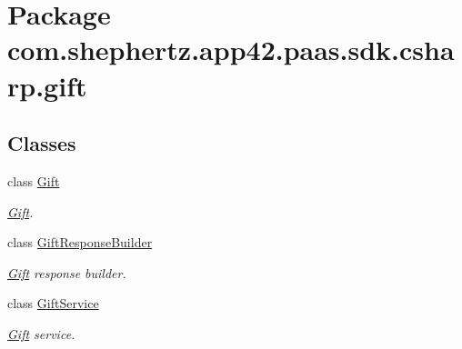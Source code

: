 \hypertarget{namespacecom_1_1shephertz_1_1app42_1_1paas_1_1sdk_1_1csharp_1_1gift}{\section{Package com.\+shephertz.\+app42.\+paas.\+sdk.\+csharp.\+gift}
\label{namespacecom_1_1shephertz_1_1app42_1_1paas_1_1sdk_1_1csharp_1_1gift}
}
\subsection*{Classes}
\begin{DoxyCompactItemize}
\item 
class \hyperlink{classcom_1_1shephertz_1_1app42_1_1paas_1_1sdk_1_1csharp_1_1gift_1_1_gift}{Gift}
\begin{DoxyCompactList}\small\item\em \hyperlink{classcom_1_1shephertz_1_1app42_1_1paas_1_1sdk_1_1csharp_1_1gift_1_1_gift}{Gift}. \end{DoxyCompactList}\item 
class \hyperlink{classcom_1_1shephertz_1_1app42_1_1paas_1_1sdk_1_1csharp_1_1gift_1_1_gift_response_builder}{Gift\+Response\+Builder}
\begin{DoxyCompactList}\small\item\em \hyperlink{classcom_1_1shephertz_1_1app42_1_1paas_1_1sdk_1_1csharp_1_1gift_1_1_gift}{Gift} response builder. \end{DoxyCompactList}\item 
class \hyperlink{classcom_1_1shephertz_1_1app42_1_1paas_1_1sdk_1_1csharp_1_1gift_1_1_gift_service}{Gift\+Service}
\begin{DoxyCompactList}\small\item\em \hyperlink{classcom_1_1shephertz_1_1app42_1_1paas_1_1sdk_1_1csharp_1_1gift_1_1_gift}{Gift} service. \end{DoxyCompactList}\end{DoxyCompactItemize}
